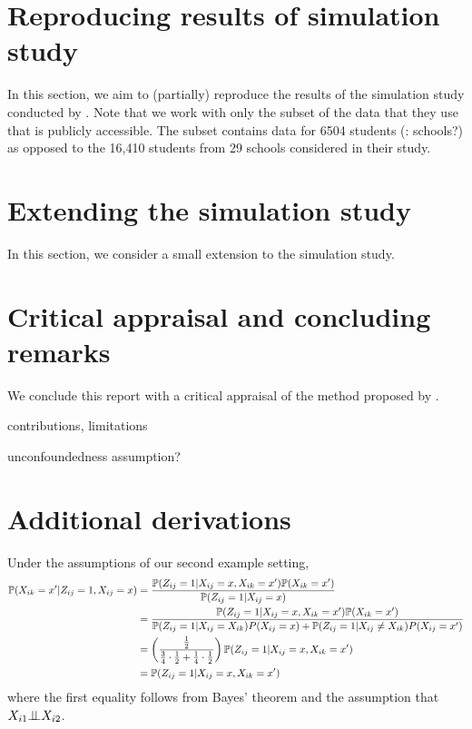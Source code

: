 \documentclass[10pt]{article}
\begin{document}
\section{Reproducing results of simulation study}

\todo In this section, we aim to (partially) reproduce the results of the simulation study conducted by \textcite{Forastiere:2021}. Note that we work with only the subset of the data that they use that is publicly accessible. The subset contains data for 6504 students (\todo: schools?) as opposed to the 16,410 students from 29 schools considered in their study.
\\


\section{Extending the simulation study}

\todo In this section, we consider a small extension to the simulation study.
\\


\section{Critical appraisal and concluding remarks}

\todo We conclude this report with a critical appraisal of the method proposed by \textcite{Forastiere:2021}.

\todo contributions, limitations

\todo unconfoundedness assumption? \textcite{Sanchez:2021}


\newpage


\begin{refcontext}[sorting=nyt]
\printbibliography
\end{refcontext}


\newpage

\appendix

\section{Additional derivations}

Under the assumptions of our second example setting,
\begin{align*}
\P(X_{ik}=x'|Z_{ij}=1,X_{ij}=x) &= \frac{\P(Z_{ij}=1|X_{ij}=x,X_{ik}=x')\P(X_{ik}=x')}{\P(Z_{ij}=1|X_{ij}=x)} \\
&= \frac{\P(Z_{ij}=1|X_{ij}=x,X_{ik}=x')\P(X_{ik}=x')}{\P(Z_{ij}=1|X_{ij}=X_{ik})P(X_{ij}=x) + \P(Z_{ij}=1|X_{ij}\neq X_{ik})P(X_{ij}=x')} \\
&= \left(\frac{\frac{1}{2}}{\frac{3}{4}\cdot\frac{1}{2}+\frac{1}{4}\cdot\frac{1}{2}}\right)\P(Z_{ij}=1|X_{ij}=x,X_{ik}=x') \\
&= \P(Z_{ij}=1|X_{ij}=x,X_{ik}=x')
\end{align*}
where the first equality follows from Bayes' theorem and the assumption that $X_{i1}\condind X_{i2}$.
\end{document}
